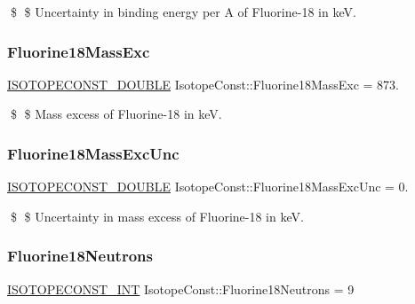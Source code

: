 \$ \$ Uncertainty in binding energy per A of Fluorine-\/18 in keV. \mbox{\label{group___isotope_const-_fluorine-_f18_gad0d9092153e40f2c4358cfad3868503e}} 
\subsubsection{\texorpdfstring{Fluorine18\+Mass\+Exc}{Fluorine18MassExc}}
{\footnotesize\ttfamily \mbox{\hyperlink{group___isotope_const-_macros_ga8f45a7272ce02c0b4c65c44636ed719a}{I\+S\+O\+T\+O\+P\+E\+C\+O\+N\+S\+T\+\_\+\+D\+O\+U\+B\+LE}} Isotope\+Const\+::\+Fluorine18\+Mass\+Exc = 873.}

\$ \$ Mass excess of Fluorine-\/18 in keV. \mbox{\label{group___isotope_const-_fluorine-_f18_ga5160f87e7fb32b18f3d0ea20bd4df568}} 
\subsubsection{\texorpdfstring{Fluorine18\+Mass\+Exc\+Unc}{Fluorine18MassExcUnc}}
{\footnotesize\ttfamily \mbox{\hyperlink{group___isotope_const-_macros_ga8f45a7272ce02c0b4c65c44636ed719a}{I\+S\+O\+T\+O\+P\+E\+C\+O\+N\+S\+T\+\_\+\+D\+O\+U\+B\+LE}} Isotope\+Const\+::\+Fluorine18\+Mass\+Exc\+Unc = 0.}

\$ \$ Uncertainty in mass excess of Fluorine-\/18 in keV. \mbox{\label{group___isotope_const-_fluorine-_f18_ga506a70b22d3e2956601e38613c1ca5b4}} 
\subsubsection{\texorpdfstring{Fluorine18\+Neutrons}{Fluorine18Neutrons}}
{\footnotesize\ttfamily \mbox{\hyperlink{group___isotope_const-_macros_ga5f18360b3e99483a35c32d789e62621c}{I\+S\+O\+T\+O\+P\+E\+C\+O\+N\+S\+T\+\_\+\+I\+NT}} Isotope\+Const\+::\+Fluorine18\+Neutrons = 9}

